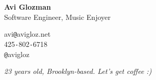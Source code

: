 \documentclass[10pt,oneside,final]{article}
\begin{document}
	\pagestyle{empty}	
	\begin{flushleft}	
		{\huge \textbf{Avi Glozman}}\\
		{\large Software Engineer, Music Enjoyer\\}
		\vspace{2mm}
		\begin{leftli}
			{\large avi\texttt{@}avigloz.net}\\
			\vspace{0.2cm}
			{\large 425\texttt{-}802\texttt{-}6718}\\
			\vspace{0.2cm}
			{\large \texttt{@}avigloz}\\
		\end{leftli}
		\vspace{-2.7cm}
		\begin{flushright}
		\end{flushright}    
		\vfill
	\end{flushleft}
	\textit{23 years old, Brooklyn-based. Let's get coffee :)}
\end{document}
